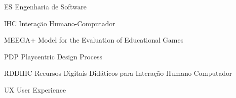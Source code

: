 \begin{siglas}
  \item[ES] Engenharia de Software
  \item[IHC] Interação Humano-Computador
  \item[MEEGA+] Model for the Evaluation of Educational Games
  \item[PDP] Playcentric Design Process
  \item[RDDIHC] Recursos Digitais Didáticos para Interação Humano-Computador
  \item[UX] User Experience

\end{siglas}
